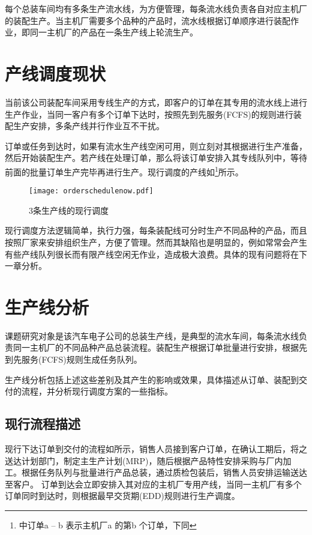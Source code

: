 每个总装车间均有多条生产流水线，为方便管理，每条流水线负责各自对应主机厂的装配生产。当主机厂需要多个品种的产品时，流水线根据订单顺序进行装配作业，即同一主机厂的产品在一条生产线上轮流生产。


\section{产线调度现状}
当前该公司装配车间采用专线生产的方式，即客户的订单在其专用的流水线上进行生产作业，当同一客户有多个订单下达时，按照先到先服务(FCFS)的规则进行装配生产安排，多条产线并行作业互不干扰。

订单或任务到达时，如果有流水生产线空闲可用，则立刻对其根据进行生产准备，然后开始装配生产。若产线在处理订单，那么将该订单安排入其专线队列中，等待前面的批量订单生产完毕再进行生产。现行调度的产线如\footnote{中订单a -- b 表示主机厂a 的第b 个订单，下同}所示。
\begin{figure}[h]
\caption{3条生产线的现行调度\label{fig:3nowschedule}}\texttt{[image: orderschedulenow.pdf]}
\end{figure}

现行调度方法逻辑简单，执行力强，每条装配线可分时生产不同品种的产品，而且按照厂家来安排组织生产，方便了管理。然而其缺陷也是明显的，例如常常会产生有些产线队列很长而有限产线空闲无作业，造成极大浪费。具体的现有问题将在下一章分析。


\section{生产线分析}
课题研究对象是该汽车电子公司的总装生产线，是典型的流水车间，每条流水线负责同一主机厂的不同品种产品总装流程。装配生产根据订单批量进行安排，根据先到先服务(FCFS)规则生成任务队列。

生产线分析包括上述这些差别及其产生的影响或效果，具体描述从订单、装配到交付的流程，并分析现行调度方案的一些指标。

\subsection{现行流程描述}
现行下达订单到交付的流程如所示，销售人员接到客户订单，在确认工期后，将之送达计划部门，制定主生产计划(MRP)，随后根据产品特性安排采购与厂内加工。根据任务队列与批量进行产品总装，通过质检包装后，销售人员安排运输送达至客户。
订单到达会立即安排入其对应的主机厂专用产线，当同一主机厂有多个订单同时到达时，则根据最早交货期(EDD)规则进行生产调度。

